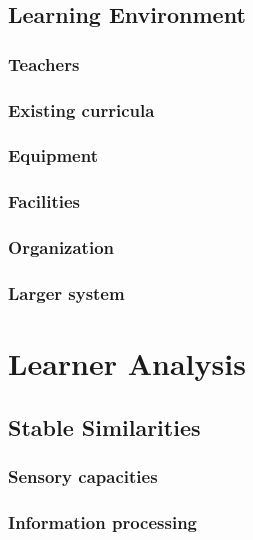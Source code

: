 \documentclass[12pt]{report} %
\begin{document}

\section{Learning Environment}

\subsection{Teachers}

\subsection{Existing curricula}

\subsection{Equipment}

\subsection{Facilities}

\subsection{Organization}

\subsection{Larger system}


\chapter{Learner Analysis}


\section{Stable Similarities}

\subsection{Sensory capacities}

\subsection{Information processing}
\end{document}
